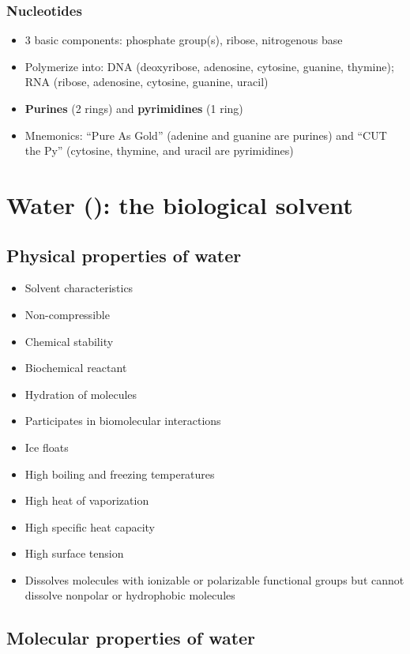 \documentclass[letterpaper, 12pt]{article}
\begin{document}
\subsubsection*{Nucleotides}

\begin{itemize}
\item 3 basic components: phosphate group(s), ribose, nitrogenous base
\item Polymerize into: DNA (deoxyribose, adenosine, cytosine, guanine, thymine); RNA (ribose, adenosine, cytosine, guanine, uracil)
\item \textbf{Purines} (2 rings) and \textbf{pyrimidines} (1 ring)
\item Mnemonics: ``Pure As Gold'' (adenine and guanine are purines) and ``CUT the Py'' (cytosine, thymine, and uracil are pyrimidines)
\end{itemize}

\newpage

\section*{Water (): the biological solvent}

\subsection*{Physical properties of water}

\begin{itemize}
\item Solvent characteristics
\item Non-compressible
\item Chemical stability
\item Biochemical reactant
\item Hydration of molecules
\item Participates in biomolecular interactions
\item Ice floats
\item High boiling and freezing temperatures
\item High heat of vaporization
\item High specific heat capacity
\item High surface tension
\item Dissolves molecules with ionizable or polarizable functional groups but cannot dissolve nonpolar or hydrophobic molecules
\end{itemize}

\subsection*{Molecular properties of water}
\end{document}
